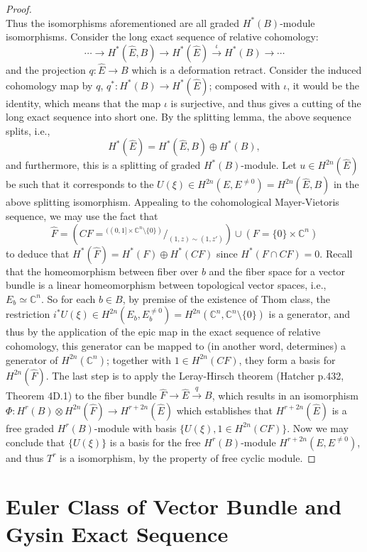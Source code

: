 \documentclass[10pt]{article}
\begin{document}
\begin{proof}
$$$$
Thus the isomorphisms aforementioned are all graded $H^*(B)$-module isomorphisms.
Consider the long exact sequence of relative cohomology:
$$\cdots\to H^*(\hat{E},B)\to H^*(\hat{E})\overset{\iota}{\to}H^*(B)\to\cdots$$
and the projection $q:\hat{E}\to B$ which is a deformation retract. Consider the induced cohomology map by $q$, $q^*:H^*(B)\to H^*(\hat{E})$; composed with $\iota$, it would be the identity, which means that the map $\iota$ is surjective, and thus gives a cutting of the long exact sequence into short one. By the splitting lemma, the above sequence splits, i.e.,
$$H^*(\hat{E})=H^*(\hat{E},B)\oplus H^*(B),$$ and furthermore, this is a splitting of graded $H^*(B)$-module. Let $u\in H^{2n}(\hat{E})$ be such that it corresponds to the $U(\xi)\in H^{2n}(E,E^{\neq0})=H^{2n}(\hat{E},B)$ in the above splitting isomorphism.
Appealing to the cohomological Mayer-Vietoris sequence, we may use the fact that
$$\hat{F}=\left(CF={}^{((0,1]\times\mathbb{C}^n\setminus\{0\})}\big/_{(1,z)\sim(1,z')}\right)\cup(F=\{0\}\times\mathbb{C}^n)$$
to deduce that $H^*(\hat{F})=H^*(F)\oplus H^*(CF)$ since $H^*(F\cap CF)=0$.
Recall that the homeomorphism between fiber over $b$ and the fiber space for a vector bundle is a linear homeomorphism between topological vector spaces, i.e., $E_b\simeq\mathbb{C}^n$. So for each $b\in B$, by premise of the existence of Thom class, the restriction $i^*U(\xi)\in H^{2n}(E_b,E_b^{\neq0})=H^{2n}(\mathbb{C}^n,\mathbb{C}^n\setminus\{0\})$ is a generator, and thus by the application of the epic map in the exact sequence of relative cohomology, this generator can be mapped to (in another word, determines) a generator of $H^{2n}(\mathbb{C}^n)$; together with $1\in H^{2n}(CF)$, they form a basis for $H^{2n}(\hat{F})$.
The last step is to apply the Leray-Hirsch theorem (Hatcher p.432, Theorem 4D.1) to the fiber bundle $\hat{F}\to\hat{E}\overset{q}{\to}B$, which results in an isomorphism $\Phi:H^r(B)\otimes H^{2n}(\hat{F})\to H^{r+2n}(\hat{E})$
which establishes that $H^{r+2n}(\hat{E})$ is a free graded $H^r(B)$-module with basis $\{U(\xi),1\in H^{2n}(CF)\}$. Now we may conclude that $\{U(\xi)\}$ is a basis for the free $H^r(B)$-module $H^{r+2n}(E,E^{\neq0})$, and thus $T^r$ is a isomorphism, by the property of free cyclic module.
\end{proof}

\section{Euler Class of Vector Bundle and Gysin Exact Sequence}
\end{document}
